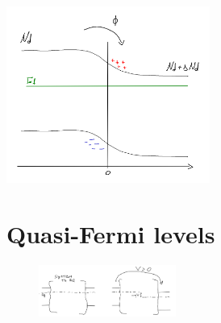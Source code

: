\centering
\includegraphics[width=0.5\textwidth]{dbeL.png}\\
\raggedright


\section{Quasi-Fermi levels}

\begin{figure}
\includegraphics[width=0.4\textwidth]{perturbation.png}
\end{figure}

